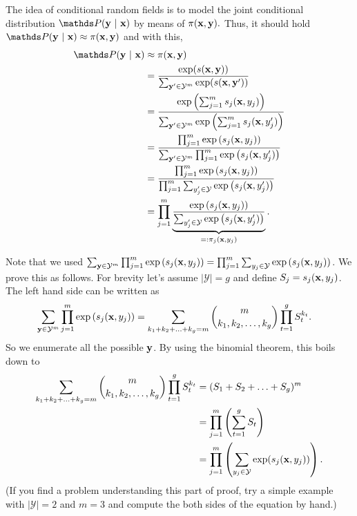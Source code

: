 \documentclass[a4paper]{article}
\begin{document}
{\begin{enumerate}
	The idea of conditional random fields is to model the joint conditional distribution $\P(\yv~|~\xv)$ by means of $\pi(\mathbf{x},\mathbf{y}).$
%	
	Thus, it should hold $\P(\yv~|~\xv) \approx \pi(\xv,\yv)$ and with this,
%	
	\begin{align*}
%		
		\P(\yv~|~\xv) 
%		
		&\approx \pi(\xv,\yv) \\
%		
		&= \frac{\exp(s(\xv,\yv))}{\sum_{\yv' \in \Yspace^m} \exp(s(\xv,\yv'))} \\
%		
		&=  \frac{\exp\left(\sum_{j=1}^m s_j(\xv,y_j)\right)}{\sum_{\yv' \in \Yspace^m} \exp \left(  \sum_{j=1}^m s_j(\xv,y_j') \right)} \\
%		
		&=  \frac{ \prod_{j=1}^m \exp\left( s_j(\xv,y_j)\right)}{\sum_{\yv' \in \Yspace^m} \prod_{j=1}^m \exp \left(  s_j(\xv,y_j') \right)} \\
%		
		&=  \frac{ \prod_{j=1}^m \exp\left( s_j(\xv,y_j)\right)}{ \prod_{j=1}^m \sum_{y_j' \in \Yspace}  \exp \left(  s_j(\xv,y_j') \right)} \\
%		
		&= \prod_{j=1}^m \underbrace{\frac{  \exp\left( s_j(\xv,y_j)\right)}{ \sum_{y_j' \in \Yspace}  \exp \left(  s_j(\xv,y_j') \right)}}_{ =:\pi_j(\xv,y_j) }. \\
%		
	\end{align*}

Note that we used $\sum_{\mathbf{y} \in \mathcal{Y}^m} \prod_{j=1}^m \exp \left( s_j(\mathbf{x},y_j) \right) = \prod_{j=1}^m \sum_{y_j \in \mathcal{Y}}  \exp \left(  s_j(\mathbf{x},y_j) \right)$. We prove this as follows. For brevity let's assume $|\mathcal{Y}| = g$ and define $S_j = s_j(\mathbf{x}, y_j)$. The left hand side can be written as 
\begin{align*}
    \sum_{\mathbf{y} \in \mathcal{Y}^m} \prod_{j=1}^m \exp \left( s_j(\mathbf{x},y_j) \right) &= \sum_{k_1 + k_2 + \ldots + k_g = m} \binom{m}{k_1, k_2, \ldots, k_g} \prod_{t=1}^g S_t^{k_t}.
\end{align*}
So we enumerate all the possible $\mathbf{y}$.
By using the binomial theorem, this boils down to 
\begin{align*}
    \sum_{k_1 + k_2 + \ldots + k_g = m} \binom{m}{k_1, k_2, \ldots, k_g} \prod_{t=1}^g S_t^{k_t}
    &= (S_1 + S_2 + \ldots + S_g)^m \\
    &= \prod_{j=1}^m \left(\sum_{t=1}^g S_t \right) \\
    &= \prod_{j=1}^m \left( \sum_{y_j \in \mathcal{Y}} \exp(s_j(\mathbf{x}, y_j)) \right). \\
\end{align*}
(If you find a problem understanding this part of proof, try a simple example with $|\mathcal{Y}| = 2$ and $m = 3$ and compute the both sides of the equation by hand.)


\end{enumerate}}
\end{document}
